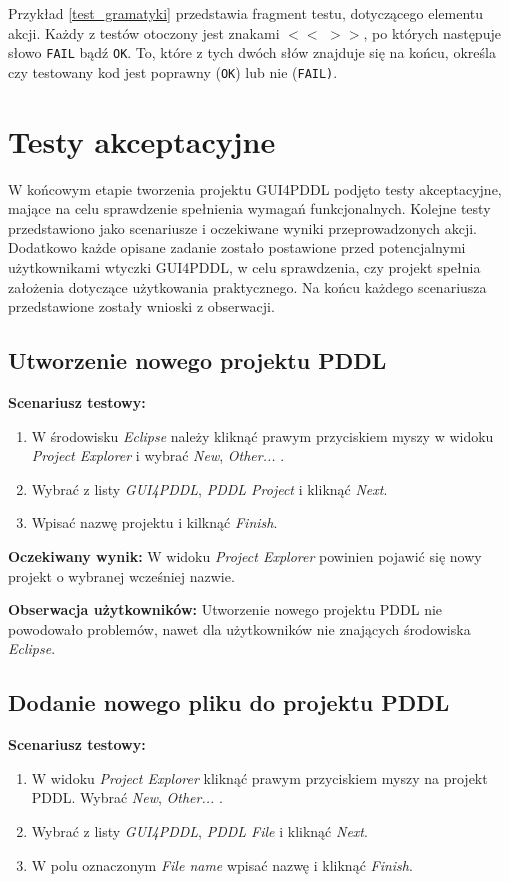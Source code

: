 Przykład \ref{test_gramatyki} przedstawia fragment testu, dotyczącego elementu akcji. Każdy z testów otoczony jest znakami \texttt{$<<$} \texttt{$>>$}, po których następuje słowo \texttt{FAIL} bądź \texttt{OK}. To, które z tych dwóch słów znajduje się na końcu, określa czy testowany kod jest poprawny (\texttt{OK}) lub nie (\texttt{FAIL)}.




\section{Testy akceptacyjne}
W końcowym etapie tworzenia projektu GUI4PDDL podjęto testy akceptacyjne, mające na celu sprawdzenie spełnienia wymagań funkcjonalnych. Kolejne testy przedstawiono jako scenariusze i oczekiwane wyniki przeprowadzonych akcji.
Dodatkowo każde opisane zadanie zostało postawione przed potencjalnymi użytkownikami wtyczki GUI4PDDL, w celu sprawdzenia, czy projekt spełnia założenia dotyczące użytkowania praktycznego. Na końcu każdego scenariusza przedstawione zostały wnioski z obserwacji. 
\subsection{Utworzenie nowego projektu PDDL}
\textbf{Scenariusz testowy:}
  \begin{enumerate}
  
\item W środowisku \textit{Eclipse} należy kliknąć prawym przyciskiem myszy w widoku \textit{Project Explorer} i wybrać \textit{New}, \textit{Other...} .
\item Wybrać z listy \textit{GUI4PDDL}, \textit{PDDL Project} i kliknąć \textit{Next}.
\item Wpisać nazwę projektu i kilknąć \textit{Finish}.
\end{enumerate}

\textbf{Oczekiwany wynik:} W widoku \textit{Project Explorer} powinien pojawić się nowy projekt o wybranej wcześniej nazwie.

\textbf{Obserwacja użytkowników:} Utworzenie nowego projektu PDDL nie powodowało problemów, nawet dla użytkowników nie znających środowiska \textit{Eclipse}.
\subsection{Dodanie nowego pliku do projektu PDDL}
\textbf{Scenariusz testowy:}
  \begin{enumerate}
  
\item W widoku \textit{Project Explorer} kliknąć prawym przyciskiem myszy na projekt PDDL. Wybrać \textit{New}, \textit{Other...} .
\item Wybrać z listy \textit{GUI4PDDL}, \textit{PDDL File} i kliknąć \textit{Next}.
\item W polu oznaczonym \textit{File name} wpisać nazwę i kliknąć \textit{Finish}.
\end{enumerate}

